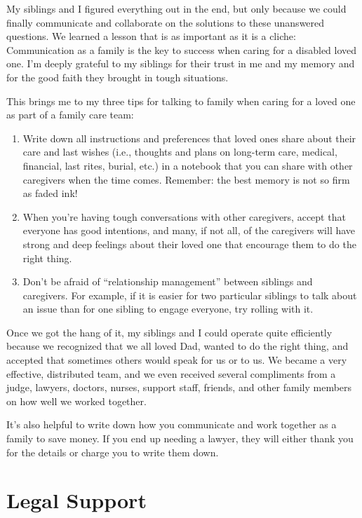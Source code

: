 \documentclass{article}
\begin{document}
My siblings and I figured everything out in the end, but only because we could finally communicate and collaborate on the solutions to these unanswered questions. We learned a lesson that is as important as it is a cliche: Communication as a family is the key to success when caring for a disabled loved one. I'm deeply grateful to my siblings for their trust in me and my memory and for the good faith they brought in tough situations.

This brings me to my three tips for talking to family when caring for a loved one as part of a family care team:
\begin{enumerate}
    \item Write down all instructions and preferences that loved ones share about their care and last wishes (i.e., thoughts and plans on long-term care, medical, financial, last rites, burial, etc.) in a notebook that you can share with other caregivers when the time comes. Remember: the best memory is not so firm as faded ink!
    \item When you're having tough conversations with other caregivers, accept that everyone has good intentions, and many, if not all, of the caregivers will have strong and deep feelings about their loved one that encourage them to do the right thing.
    \item Don't be afraid of ``relationship management'' between siblings and caregivers. For example, if it is easier for two particular siblings to talk about an issue than for one sibling to engage everyone, try rolling with it.
\end{enumerate}

Once we got the hang of it, my siblings and I could operate quite efficiently because we recognized that we all loved Dad, wanted to do the right thing, and accepted that sometimes others would speak for us or to us. We became a very effective, distributed team, and we even received several compliments from a judge, lawyers, doctors, nurses, support staff, friends, and other family members on how well we worked together.

It's also helpful to write down how you communicate and work together as a family to save money. If you end up needing a lawyer, they will either thank you for the details or charge you to write them down.

\section*{Legal Support}
\end{document}
